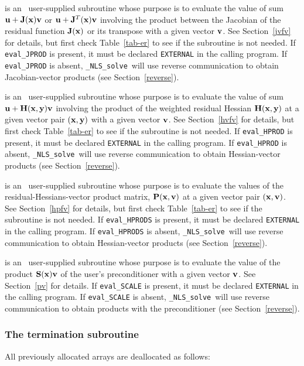 \documentclass{galahad}
\newcommand{\packagename}{NLS}
\newcommand{\fullpackagename}{\libraryname\_\packagename}
\newcommand{\solver}{{\tt \fullpackagename\_solve}}
\begin{document}
\begin{description}
 is an \optional\
user-supplied subroutine whose purpose is to evaluate the value of sum
${\mathbf{u}} + {\mathbf{J}}({\mathbf{x}}){\mathbf{v}}$ or ${\mathbf{u}} + {\mathbf{J}}^T({\mathbf{x}}){\mathbf{v}}$ involving the
product between the Jacobian of the
residual function ${\mathbf{J}}({\mathbf{x}})$ or its transpose with a given vector ${\mathbf{v}}$.
See Section~\ref{jvfv} for details,
but first check Table~\ref{tab-er} to see if the subroutine is not needed.
If {\tt eval\_JPROD} is present,
it must be declared {\tt EXTERNAL} in the calling program.
If {\tt eval\_JPROD} is absent, \solver\ will use reverse communication to
obtain Jacobian-vector products (see Section~\ref{reverse}).

 is an \optional\
user-supplied subroutine whose purpose is to evaluate the value of sum
${\mathbf{u}} + {\mathbf{H}}({\mathbf{x}},{\mathbf{y}}) {\mathbf{v}}$ involving the product of the weighted residual
Hessian ${\mathbf{H}}({\mathbf{x}},{\mathbf{y}})$ at a given vector pair $({\mathbf{x}},{\mathbf{y}})$
with a given vector ${\mathbf{v}}$. See Section~\ref{hvfv} for details,
but first check Table~\ref{tab-er} to see if the subroutine is not needed.
If {\tt eval\_HPROD} is present,
it must be declared {\tt EXTERNAL} in the calling program.
If {\tt eval\_HPROD} is absent, \solver\ will use reverse communication to
obtain Hessian-vector products (see Section~\ref{reverse}).

 is an \optional\
user-supplied subroutine whose purpose is to evaluate the values of the
residual-Hessians-vector product matrix, ${\mathbf{P}}({\mathbf{x}},{\mathbf{v}})$
at a given vector pair $({\mathbf{x}},{\mathbf{v}})$.
See Section~\ref{hpfv} for details,
but first check Table~\ref{tab-er} to see if the subroutine is not needed.
If {\tt eval\_HPRODS} is present,
it must be declared {\tt EXTERNAL} in the calling program.
If {\tt eval\_HPRODS} is absent, \solver\ will use reverse communication to
obtain Hessian-vector products (see Section~\ref{reverse}).

\itt{eval\_SCALE} is an \optional\
user-supplied subroutine whose purpose is to evaluate the value of the
product ${\mathbf{S}}({\mathbf{x}}){\mathbf{v}}$ of the user's preconditioner with a given vector
${\mathbf{v}}$. See Section~\ref{pv} for details.
If {\tt eval\_SCALE} is present,
it must be declared {\tt EXTERNAL} in the calling program.
If {\tt eval\_SCALE} is absent, \solver\ will use reverse communication to
obtain products with the preconditioner (see Section~\ref{reverse}).

\end{description}


\subsubsection{The  termination subroutine}
All previously allocated arrays are deallocated as follows:
\vspace*{1mm}
\end{document}
